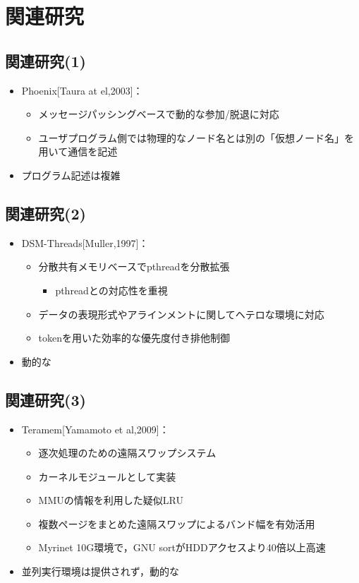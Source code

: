 \documentclass[25pt,landscape,papersize]{jsarticle}
\begin{document}
\section{関連研究}

\subsection{関連研究(1)}

\begin{itemize}
\item Phoenix[Taura at el,2003]：
  \begin{itemize}
  \item メッセージパッシングベースで動的な参加/脱退に対応
  \item ユーザプログラム側では物理的なノード名とは別の「仮想ノード名」を用いて通信を記述
  \end{itemize}
\item プログラム記述は複雑
\end{itemize}


\subsection{関連研究(2)}

\begin{itemize}
\item DSM-Threads[Muller,1997]：
  \begin{itemize}
  \item 分散共有メモリベースでpthreadを分散拡張
    \begin{itemize}
    \item pthreadとの対応性を重視
    \end{itemize}
  \item データの表現形式やアラインメントに関してヘテロな環境に対応
  \item tokenを用いた効率的な優先度付き排他制御
  \end{itemize}
\item 動的な
\end{itemize}

\subsection{関連研究(3)}

\begin{itemize}
\item Teramem[Yamamoto et al,2009]：
  \begin{itemize}
  \item 逐次処理のための遠隔スワップシステム
  \item カーネルモジュールとして実装
  \item MMUの情報を利用した疑似LRU
  \item 複数ページをまとめた遠隔スワップによるバンド幅を有効活用
  \item Myrinet 10G環境で，GNU sortがHDDアクセスより40倍以上高速
  \end{itemize}
\item 並列実行環境は提供されず，動的な
\end{itemize}
\end{document}
